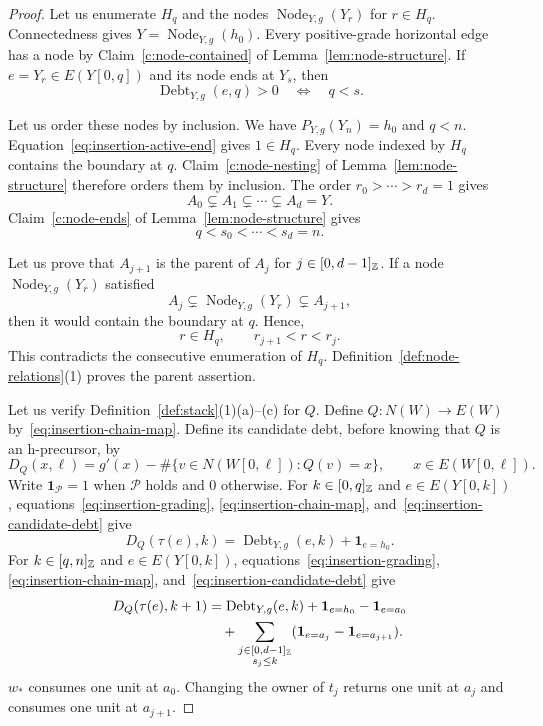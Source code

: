 \begin{proof}
 Let us enumerate $H_q$ and the nodes $\operatorname{Node}_{Y,g}(Y_r)$ for $r\in H_q$. Connectedness gives $Y=\operatorname{Node}_{Y,g}(h_0)$. Every positive-grade horizontal edge has a node by Claim~\ref{c:node-contained} of Lemma~\ref{lem:node-structure}. If $e=Y_r\in E(Y[0,q])$ and its node ends at $Y_s$, then
\begin{equation}\label{eq:insertion-active-end}
 \operatorname{Debt}_{Y,g}(e,q)>0\quad\Longleftrightarrow\quad q<s.
\end{equation}

Let us order these nodes by inclusion.
We have $P_{Y,g}(Y_n)=h_0$ and $q<n$.
Equation~\eqref{eq:insertion-active-end} gives $1\in H_q$.
Every node indexed by $H_q$ contains the boundary at $q$.
Claim~\ref{c:node-nesting} of Lemma~\ref{lem:node-structure} therefore orders them by inclusion.
The order $r_0>\cdots>r_d=1$ gives
\[
 A_0\subsetneq A_1\subsetneq\cdots\subsetneq A_d=Y.
\]
Claim~\ref{c:node-ends} of Lemma~\ref{lem:node-structure} gives
\[
 q<s_0<\cdots<s_d=n.
\]

Let us prove that $A_{j+1}$ is the parent of $A_j$ for $j\in[0,d-1]_{\mathbb Z}$.
If a node $\operatorname{Node}_{Y,g}(Y_r)$ satisfied
\[
 A_j\subsetneq\operatorname{Node}_{Y,g}(Y_r)\subsetneq A_{j+1},
\]
then it would contain the boundary at $q$. Hence,
\[
 r\in H_q,\qquad r_{j+1}<r<r_j.
\]
This contradicts the consecutive enumeration of $H_q$.
Definition~\ref{def:node-relations}(1) proves the parent assertion.

 Let us verify Definition~\ref{def:stack}(1)(a)--(c) for $Q$. Define $Q:N(W)\to E(W)$ by~\eqref{eq:insertion-chain-map}. Define its candidate debt, before knowing that $Q$ is an h-precursor, by
\begin{equation}\label{eq:insertion-candidate-debt}
 D_Q(x,\ell)=g'(x)-\#\{v\in N(W[0,\ell]):Q(v)=x\},
 \qquad x\in E(W[0,\ell]).
\end{equation}
Write $\mathbf1_{\mathcal P}=1$ when $\mathcal P$ holds and $0$ otherwise. For $k\in[0,q]_{\mathbb Z}$ and $e\in E(Y[0,k])$, equations~\eqref{eq:insertion-grading}, \eqref{eq:insertion-chain-map}, and~\eqref{eq:insertion-candidate-debt} give
\begin{equation}\label{eq:insertion-debt-before}
 D_Q(\tau(e),k)=\operatorname{Debt}_{Y,g}(e,k)+\mathbf1_{e=h_0}.
\end{equation}
For $k\in[q,n]_{\mathbb Z}$ and $e\in E(Y[0,k])$, equations~\eqref{eq:insertion-grading}, \eqref{eq:insertion-chain-map}, and~\eqref{eq:insertion-candidate-debt} give
\begin{equation}\label{eq:insertion-debt-after}
 \begin{aligned}
 D_Q(\tau(e),k+1)
 &=\operatorname{Debt}_{Y,g}(e,k)+\mathbf1_{e=h_0}-\mathbf1_{e=a_0}\\
 &\quad+\sum_{\substack{j\in[0,d-1]_{\mathbb Z}\\s_j\le k}}
       (\mathbf1_{e=a_j}-\mathbf1_{e=a_{j+1}}).
 \end{aligned}
\end{equation}
$w_*$ consumes one unit at $a_0$. Changing the owner of $t_j$ returns one unit at $a_j$ and consumes one unit at $a_{j+1}$.


\end{proof}
